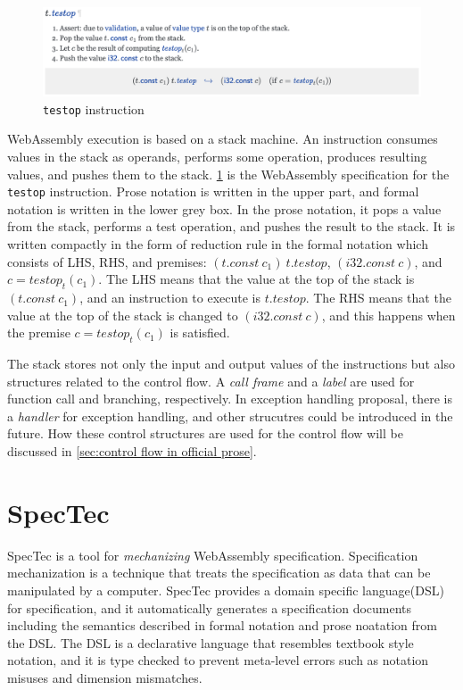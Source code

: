 \begin{figure}[t]
    \centerline{\includegraphics[width=15cm]{fig/testop}}
    \caption[Enter the caption title here]{\texttt{testop} instruction} \label{fig:testop}
\end{figure}


WebAssembly execution is based on a stack machine.
An instruction consumes values in the stack as operands, performs some
operation, produces resulting values, and pushes them to the stack.
\cref{fig:testop} is the WebAssembly specification for the \texttt{testop}
instruction.
Prose notation is written in the upper part, and formal notation is written in
the lower grey box.
In the prose notation, it pops a value from the stack, performs a test
operation, and pushes the result to the stack.
It is written compactly in the form of reduction rule in the formal notation
which consists of LHS, RHS, and premises: $(t.const ~ c_1) ~ t.testop$,
$(i32.const ~ c)$, and $c = testop_t(c_1)$.
The LHS means that the value at the top of the stack is $(t.const ~ c_1)$,
and an instruction to execute is $t.testop$.
The RHS means that the value at the top of the stack is changed to $(i32.const
~ c)$, and this happens when the premise $c = testop_t(c_1)$ is satisfied.


The stack stores not only the input and output values of the instructions but also
structures related to the control flow.
A \textit{call frame} and a \textit{label} are used for function call and
branching, respectively.
In exception handling proposal, there is a \textit{handler} for exception
handling, and other strucutres could be introduced in the future.
How these control structures are used for the control flow will be discussed in
\cref{sec:control flow in official prose}.

\section{SpecTec}


SpecTec is a tool for \textit{mechanizing} WebAssembly specification.
Specification mechanization is a technique that treats the specification as
data that can be manipulated by a computer.
SpecTec provides a domain specific language(DSL) for specification, and it
automatically generates a specification documents including the semantics
described in formal notation and prose noatation from the DSL.
The DSL is a declarative language that resembles textbook style notation, and
it is type checked to prevent meta-level errors such as notation misuses and
dimension mismatches.


